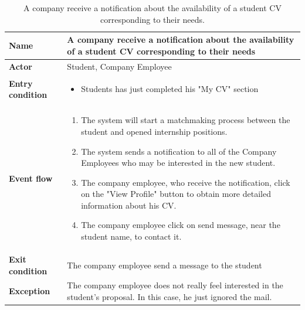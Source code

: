     \begin{table}[H]
        \centering
        \begin{tabular}{|l|p{11.9cm}|}
        \hline
        \textbf{Name}            & A company receive a notification about the availability of a student CV corresponding to their needs \\\hline
        \textbf{Actor}           & Student, Company Employee       \\\hline
        \textbf{Entry condition} &
        \begin{itemize}
              \item Students has just completed his "My CV" section
        \end{itemize}                                        \\\hline
        \textbf{Event flow}      &
        \begin{enumerate}[label=\arabic*.]
              \item The system will start a matchmaking process between the student and opened internship positions.
              \item The system sends a notification to all of the Company Employees who may be interested in the new student.
              \item The company employee, who receive the notification, click on the "View Profile" button to obtain more detailed information about his CV.
              \item The company employee click on send message, near the student name, to contact it.
              
        \end{enumerate}            \\\hline
        \textbf{Exit condition}  & The company employee send a message to the student  \\\hline
        \textbf{Exception}       &  The company employee does not really feel interested in the student's proposal. In this case, he just ignored the mail.   \\\hline
        \end{tabular}
        \caption{A company receive a notification about the availability of a student CV corresponding to their needs.}
        \label{table:A company receive a notification about the availability of a student CV corresponding to their needs}
    \end{table}

